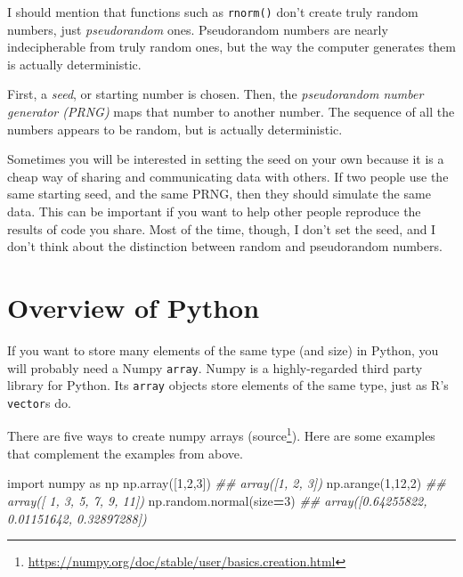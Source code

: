 \documentclass[12pt,krantz2]{krantz}
\makeatletter
\newenvironment{Shaded}{\begin{snugshade}}{\end{snugshade}}
\newcommand{\CommentTok}[1]{\textcolor[rgb]{0.37,0.37,0.37}{\textit{#1}}}
\newcommand{\DecValTok}[1]{\textcolor[rgb]{0.06,0.06,0.06}{#1}}
\newcommand{\ImportTok}[1]{#1}
\newcommand{\NormalTok}[1]{#1}
\newcommand{\OperatorTok}[1]{\textcolor[rgb]{0.43,0.43,0.43}{\textbf{#1}}}
\renewcommand{\href}[2]{#2\footnote{\url{#1}}}
\newenvironment{kframe}{%
\medskip{}
\setlength{\fboxsep}{.8em}
 \def\at@end@of@kframe{}%
 \ifinner\ifhmode%
  \def\at@end@of@kframe{\end{minipage}}%
  \begin{minipage}{\columnwidth}%
 \fi\fi%
 \def\FrameCommand##1{\hskip\@totalleftmargin \hskip-\fboxsep
 \colorbox{shadecolor}{##1}\hskip-\fboxsep
     \hskip-\linewidth \hskip-\@totalleftmargin \hskip\columnwidth}%
 \MakeFramed {\advance\hsize-\width
   \@totalleftmargin\z@ \linewidth\hsize
   \@setminipage}}%
 {\par\unskip\endMakeFramed%
 \at@end@of@kframe}
\renewenvironment{Shaded}{\begin{kframe}}{\end{kframe}}
\makeatother
\begin{document}
\begin{rmd-details}
I should mention that functions such as \texttt{rnorm()} don't create truly random numbers, just \emph{pseudorandom} ones. Pseudorandom numbers are nearly indecipherable from truly random ones, but the way the computer generates them is actually deterministic.

First, a \emph{seed}, or starting number is chosen. Then, the \emph{pseudorandom number generator (PRNG)} maps that number to another number. The sequence of all the numbers appears to be random, but is actually deterministic.

Sometimes you will be interested in setting the seed on your own because it is a cheap way of sharing and communicating data with others. If two people use the same starting seed, and the same PRNG, then they should simulate the same data. This can be important if you want to help other people reproduce the results of code you share. Most of the time, though, I don't set the seed, and I don't think about the distinction between random and pseudorandom numbers.

\end{rmd-details}

\hypertarget{overview-of-python}{%
\section{Overview of Python}\label{overview-of-python}}

If you want to store many elements of the same type (and size) in Python, you will probably need a Numpy \texttt{array}. Numpy is a highly-regarded third party library \citep{harris2020array} for Python. Its \texttt{array} objects store elements of the same type, just as R's \texttt{vector}s do.

There are five ways to create numpy arrays (\href{https://numpy.org/doc/stable/user/basics.creation.html}{source}). Here are some examples that complement the examples from above.

\begin{Shaded}
\begin{Highlighting}[]
\ImportTok{import}\NormalTok{ numpy }\ImportTok{as}\NormalTok{ np   }
\NormalTok{np.array([}\DecValTok{1}\NormalTok{,}\DecValTok{2}\NormalTok{,}\DecValTok{3}\NormalTok{])}
\CommentTok{## array([1, 2, 3])}
\NormalTok{np.arange(}\DecValTok{1}\NormalTok{,}\DecValTok{12}\NormalTok{,}\DecValTok{2}\NormalTok{)}
\CommentTok{## array([ 1,  3,  5,  7,  9, 11])}
\NormalTok{np.random.normal(size}\OperatorTok{=}\DecValTok{3}\NormalTok{)}
\CommentTok{## array([0.64255822, 0.01151642, 0.32897288])}
\end{Highlighting}
\end{Shaded}
\end{document}

